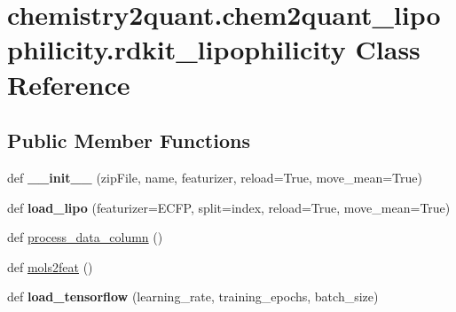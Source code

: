 \hypertarget{classchemistry2quant_1_1chem2quant__lipophilicity_1_1rdkit__lipophilicity}{}\section{chemistry2quant.\+chem2quant\+\_\+lipophilicity.\+rdkit\+\_\+lipophilicity Class Reference}
\label{classchemistry2quant_1_1chem2quant__lipophilicity_1_1rdkit__lipophilicity}
\subsection*{Public Member Functions}
\begin{DoxyCompactItemize}
\item
\mbox{\label{classchemistry2quant_1_1chem2quant__lipophilicity_1_1rdkit__lipophilicity_af5b6fb3d40a8cce2f1b344812db04725}}
def {\bfseries \+\_\+\+\_\+init\+\_\+\+\_\+} (zip\+File, name, featurizer, reload=True, move\+\_\+mean=True)
\item
\mbox{\label{classchemistry2quant_1_1chem2quant__lipophilicity_1_1rdkit__lipophilicity_aaea0b378e8a9497dbb78a3c4c57150b6}}
def {\bfseries load\+\_\+lipo} (featurizer=\textquotesingle{}E\+C\+FP\textquotesingle{}, split=\textquotesingle{}index\textquotesingle{}, reload=True, move\+\_\+mean=True)
\item
def \hyperlink{classchemistry2quant_1_1chem2quant__lipophilicity_1_1rdkit__lipophilicity_a46c111c55d4619ab2865950b46d6c361}{process\+\_\+data\+\_\+column} ()
\item
def \hyperlink{classchemistry2quant_1_1chem2quant__lipophilicity_1_1rdkit__lipophilicity_a0529318f2021adfc7004f786ac98848d}{mols2feat} ()
\item
\mbox{\label{classchemistry2quant_1_1chem2quant__lipophilicity_1_1rdkit__lipophilicity_a36ee971cb0428619d675d1482e077d08}}
def {\bfseries load\+\_\+tensorflow} (learning\+\_\+rate, training\+\_\+epochs, batch\+\_\+size)
\item
\mbox{\label{classchemistry2quant_1_1chem2quant__lipophilicity_1_1rdkit__lipophilicity_a50246b2da424307fce4c177cb02da8e0}}

\end{DoxyCompactItemize}
